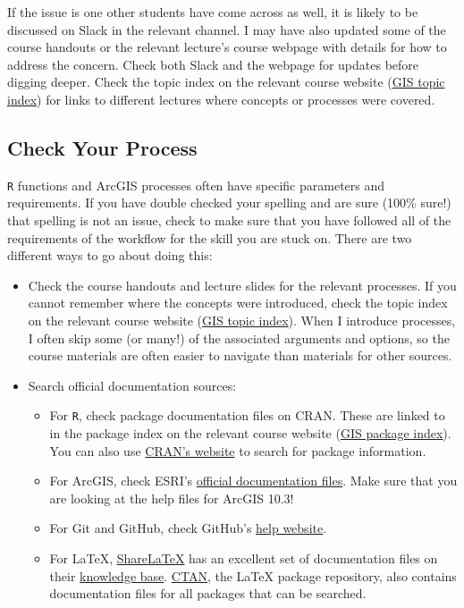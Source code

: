 \documentclass[]{book}
\providecommand{\tightlist}{%
  \setlength{\itemsep}{0pt}\setlength{\parskip}{0pt}}
\theoremstyle{definition}
\theoremstyle{definition}
\theoremstyle{definition}
\theoremstyle{remark}
\begin{document}
If the issue is one other students have come across as well, it is
likely to be discussed on Slack in the relevant channel. I may have also
updated some of the course handouts or the relevant lecture's course
webpage with details for how to address the concern. Check both Slack
and the webpage for updates before digging deeper. Check the topic index
on the relevant course website
(\href{https://slu-soc5650.github.io/topic-index/}{GIS topic index}) for
links to different lectures where concepts or processes were covered.

\subsection{Check Your Process}\label{check-your-process}

\texttt{R} functions and ArcGIS processes often have specific parameters
and requirements. If you have double checked your spelling and are sure
(100\% sure!) that spelling is not an issue, check to make sure that you
have followed all of the requirements of the workflow for the skill you
are stuck on. There are two different ways to go about doing this:

\begin{itemize}
\tightlist
\item
  Check the course handouts and lecture slides for the relevant
  processes. If you cannot remember where the concepts were introduced,
  check the topic index on the relevant course website
  (\href{https://slu-soc5650.github.io/topic-index/}{GIS topic index}).
  When I introduce processes, I often skip some (or many!) of the
  associated arguments and options, so the course materials are often
  easier to navigate than materials for other sources.
\item
  Search official documentation sources:

  \begin{itemize}
  \tightlist
  \item
    For \texttt{R}, check package documentation files on CRAN. These are
    linked to in the package index on the relevant course website
    (\href{https://slu-soc5650.github.io/package-index/}{GIS package
    index}). You can also use \href{https://cran.r-project.org}{CRAN's
    website} to search for package information.
  \item
    For ArcGIS, check ESRI's
    \href{http://desktop.arcgis.com/en/arcmap/}{official documentation
    files}. Make sure that you are looking at the help files for ArcGIS
    10.3!
  \item
    For Git and GitHub, check GitHub's
    \href{https://help.github.com}{help website}.
  \item
    For LaTeX, \href{https://www.sharelatex.com/}{ShareLaTeX} has an
    excellent set of documentation files on their
    \href{https://www.sharelatex.com/learn/Main_Page}{knowledge base}.
    \href{https://ctan.org}{CTAN}, the LaTeX package repository, also
    contains documentation files for all packages that can be searched.
  \end{itemize}
\end{itemize}
\end{document}
